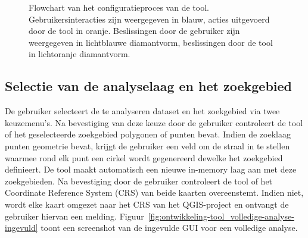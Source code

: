 \begin{figure}[htbp]
{
    }
    \caption{Flowchart van het configuratieproces van de tool. Gebruikersinteracties zijn weergegeven in blauw, acties uitgevoerd door de tool in oranje. Beslissingen door de gebruiker zijn weergegeven in lichtblauwe diamantvorm, beslissingen door de tool in lichtoranje diamantvorm.}\label{fig:config_flowchart}
\end{figure}

\subsection{Selectie van de analyselaag en het zoekgebied}
De gebruiker selecteert de te analyseren dataset en het zoekgebied via twee keuzemenu's. Na bevestiging van deze keuze door de gebruiker controleert de tool of het geselecteerde zoekgebied polygonen of punten bevat. Indien de zoeklaag punten geometrie bevat, krijgt de gebruiker een veld om de straal in te stellen waarmee rond elk punt een cirkel wordt gegenereerd dewelke het zoekgebied definieert. De tool maakt automatisch een nieuwe in-memory laag aan met deze zoekgebieden. Na bevestiging door de gebruiker controleert de tool of het Coordinate Reference System (CRS) van beide kaarten overeenstemt. Indien niet, wordt elke kaart omgezet naar het CRS van het QGIS-project en ontvangt de gebruiker hiervan een melding. Figuur~\ref{fig:ontwikkeling-tool_volledige-analyse-ingevuld} toont een screenshot van de ingevulde GUI voor een volledige analyse.\medskip

